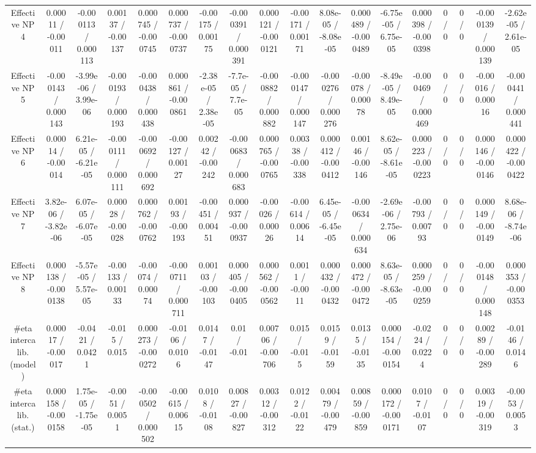 \documentclass[10pt]{article}
\begin{document}
\begin{table}[htbp]
\begin{center}
\begin{tabular}{|c|c|c|c|c|c|c|c|c|c|c|c|c|c|c|c|c|c|}
  Effective NP 4 & 0.00011 / -0.00011 & -0.000113 / 0.000113 & 0.00137 / -0.00137 & 0.000745 / -0.000745 & 0.000737 / -0.000737 & -0.00175 / 0.00175 & -0.000391 / 0.000391 & 0.000121 / -0.000121 & -0.00171 / 0.00171 & 8.08e-05 / -8.08e-05 & 0.000489 / -0.000489 & -6.75e-05 / 6.75e-05 & 0.000398 / -0.000398 & 0 / 0 & 0 / 0 & -0.000139 / 0.000139 & -2.62e-05 / 2.61e-05 \\ 
  Effective NP 5 & -0.000143 / 0.000143 & -3.99e-06 / 3.99e-06 & -0.000193 / 0.000193 & -0.000438 / 0.000438 & 0.000861 / -0.000861 & -2.38e-05 / 2.38e-05 & -7.7e-05 / 7.7e-05 & -0.000882 / 0.000882 & -0.000147 / 0.000147 & -0.000276 / 0.000276 & -0.00078 / 0.00078 & -8.49e-05 / 8.49e-05 & -0.000469 / 0.000469 & 0 / 0 & 0 / 0 & -0.00016 / 0.00016 & -0.000441 / 0.000441 \\ 
  Effective NP 6 & 0.00014 / -0.00014 & 6.21e-05 / -6.21e-05 & -0.000111 / 0.000111 & -0.000692 / 0.000692 & -0.00127 / 0.00127 & 0.00242 / -0.00242 & -0.000683 / 0.000683 & 0.000765 / -0.000765 & 0.00338 / -0.00338 & 0.000412 / -0.000412 & 0.00146 / -0.00146 & 8.62e-05 / -8.61e-05 & 0.000223 / -0.000223 & 0 / 0 & 0 / 0 & 0.000146 / -0.000146 & 0.000422 / -0.000422 \\ 
  Effective NP 7 & 3.82e-06 / -3.82e-06 & 6.07e-05 / -6.07e-05 & 0.00028 / -0.00028 & 0.000762 / -0.000762 & 0.00193 / -0.00193 & -0.00451 / 0.00451 & 0.000937 / -0.000937 & -0.00026 / 0.00026 & -0.00614 / 0.00614 & 6.45e-05 / -6.45e-05 & -0.000634 / 0.000634 & -2.69e-06 / 2.75e-06 & -0.00793 / 0.00793 & 0 / 0 & 0 / 0 & 0.000149 / -0.000149 & 8.68e-06 / -8.74e-06 \\ 
  Effective NP 8 & 0.000138 / -0.000138 & -5.57e-05 / 5.57e-05 & -0.00133 / 0.00133 & -0.00074 / 0.00074 & -0.000711 / 0.000711 & 0.00103 / -0.00103 & 0.000405 / -0.000405 & 0.000562 / -0.000562 & 0.0011 / -0.0011 & 0.000432 / -0.000432 & 0.000472 / -0.000472 & 8.63e-05 / -8.63e-05 & 0.000259 / -0.000259 & 0 / 0 & 0 / 0 & -0.000148 / 0.000148 & 0.000353 / -0.000353 \\ 
  #eta intercalib. (model) & 0.00017 / -0.00017 & -0.0421 / 0.0421 & -0.015 / 0.015 & 0.000273 / -0.000272 & -0.0106 / 0.0106 & 0.0147 / -0.0147 & 0.01 / -0.01 & 0.00706 / -0.00706 & 0.015 / -0.015 & 0.0159 / -0.0159 & 0.0135 / -0.0135 & 0.000154 / -0.000154 & -0.0224 / 0.0224 & 0 / 0 & 0 / 0 & 0.00289 / -0.00289 & -0.0146 / 0.0146 \\ 
  #eta intercalib. (stat.) & 0.000158 / -0.000158 & 1.75e-05 / -1.75e-05 & -0.0051 / 0.0051 & -0.000502 / 0.000502 & -0.00615 / 0.00615 & 0.0108 / -0.0108 & 0.00827 / -0.00827 & 0.00312 / -0.00312 & 0.0122 / -0.0122 & 0.00479 / -0.00479 & 0.00859 / -0.00859 & 0.000172 / -0.000171 & 0.0107 / -0.0107 & 0 / 0 & 0 / 0 & 0.00319 / -0.00319 & -0.0053 / 0.0053 \\ 

\end{tabular}
\end{center}
\end{table}
\end{document}
